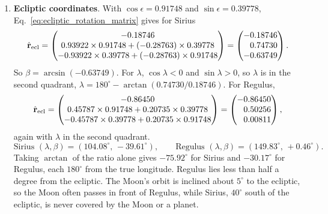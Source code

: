 \begin{enumerate}[label=(\alph*)]
	\item \textbf{Ecliptic coordinates}. With $\cos\epsilon=0.91748$ and $\sin\epsilon=0.39778$, Eq.~\eqref{eq:ecliptic_rotation_matrix} gives for Sirius
	\[
	\hat{\mathbf r}_{\rm ecl}=\begin{pmatrix}-0.18746\\ 0.93922\times0.91748+(-0.28763)\times0.39778\\ -0.93922\times0.39778+(-0.28763)\times0.91748\end{pmatrix}=\begin{pmatrix}-0.18746\\ \phantom{-}0.74730\\ -0.63749\end{pmatrix}.
	\]
	So $\beta=\arcsin(-0.63749)$. For $\lambda$, $\cos\lambda<0$ and $\sin\lambda>0$, so $\lambda$ is in the second quadrant, $\lambda=180^\circ-\arctan(0.74730/0.18746)$. For Regulus,
	\[
	\hat{\mathbf r}_{\rm ecl}=\begin{pmatrix}-0.86450\\ 0.45787\times0.91748+0.20735\times0.39778\\ -0.45787\times0.39778+0.20735\times0.91748\end{pmatrix}=\begin{pmatrix}-0.86450\\ \phantom{-}0.50256\\ \phantom{-}0.00811\end{pmatrix},
	\]
	again with $\lambda$ in the second quadrant.
	\[
	\boxed{\text{Sirius } (\lambda,\beta)=(104.08^\circ,\,-39.61^\circ),\qquad \text{Regulus } (\lambda,\beta)=(149.83^\circ,\,+0.46^\circ).}
	\]
	Taking $\arctan$ of the ratio alone gives $-75.92^\circ$ for Sirius and $-30.17^\circ$ for Regulus, each $180^\circ$ from the true longitude. Regulus lies less than half a degree from the ecliptic. The Moon's orbit is inclined about $5^\circ$ to the ecliptic, so the Moon often passes in front of Regulus, while Sirius, $40^\circ$ south of the ecliptic, is never covered by the Moon or a planet.
\end{enumerate}
